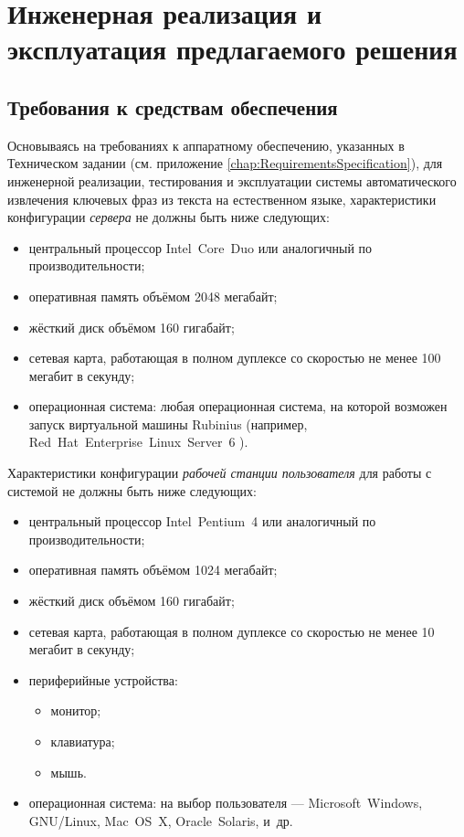 \chapter{Инженерная реализация и эксплуатация предлагаемого решения}
\label{chap:Implementation}

\section{Требования к средствам обеспечения}
Основываясь на требованиях к аппаратному обеспечению, указанных в
Техническом задании (см. приложение
\ref{chap:RequirementsSpecification}), для инженерной реализации,
тестирования и эксплуатации системы автоматического извлечения
ключевых фраз из текста на естественном языке, характеристики
конфигурации \emph{сервера} не должны быть ниже следующих:
\begin{itemize}
  \item центральный процессор
Intel\textregistered~Core\textregistered~Duo или аналогичный по
производительности;
  \item оперативная память объёмом 2048 мегабайт;
  \item жёсткий диск объёмом 160 гигабайт;
  \item сетевая карта, работающая в полном дуплексе со
скоростью не менее 100 мегабит в секунду;
  \item операционная система: любая операционная система,
на которой возможен запуск виртуальной машины Rubinius
(например,
Red~Hat\textregistered~Enterprise~Linux\textregistered~Server~6
\cite{RHELS}).
\end{itemize}

Характеристики конфигурации \emph{рабочей станции пользователя}
для работы с системой не должны быть ниже следующих:
\begin{itemize}
  \item центральный процессор
Intel\textregistered~Pentium\textregistered~4 или аналогичный по
производительности;
  \item оперативная память объёмом 1024 мегабайт;
  \item жёсткий диск объёмом 160 гигабайт;
  \item сетевая карта, работающая в полном дуплексе со скоростью
не менее 10 мегабит в секунду;
  \item периферийные устройства:
  \begin{itemize}
    \item монитор;
    \item клавиатура;
    \item мышь.
  \end{itemize}
  \item операционная система: на выбор пользователя —
Microsoft\textregistered~Windows\textregistered,
GNU/Linux, Mac~OS~X, Oracle\textregistered~Solaris\texttrademark,
и\ др.
\end{itemize}

